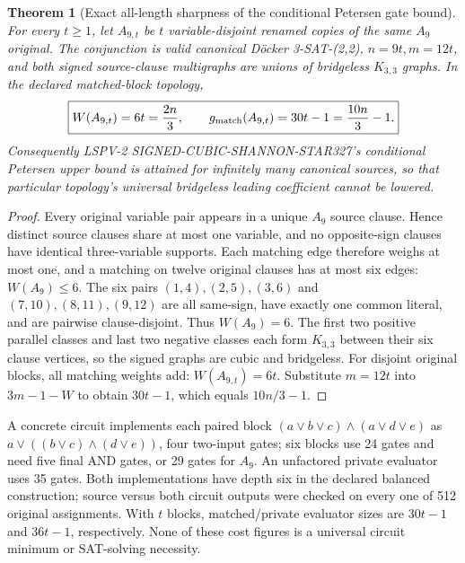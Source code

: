 \documentclass[11pt]{article}
\newtheorem{theorem}{Theorem}
\begin{document}
\begin{theorem}[Exact all-length sharpness of the conditional Petersen gate bound]
For every $t\ge1$, let $A_{9,t}$ be $t$ variable-disjoint renamed copies of the same $A_9$ original. The conjunction is valid canonical D\"ocker 3-SAT-(2,2), $n=9t,m=12t$, and both signed source-clause multigraphs are unions of bridgeless $K_{3,3}$ graphs. In the declared matched-block topology,
\[
\boxed{W(A_{9,t})=6t=\frac{2n}{3},\qquad
g_{\rm match}(A_{9,t})=30t-1=\frac{10n}{3}-1.}
\]
Consequently LSPV-2 SIGNED-CUBIC-SHANNON-STAR327's conditional Petersen \emph{upper} bound is attained for infinitely many canonical sources, so that particular topology's universal bridgeless leading coefficient cannot be lowered.
\end{theorem}
\begin{proof}
Every original variable pair appears in a unique $A_9$ source clause. Hence distinct source clauses share at most one variable, and no opposite-sign clauses have identical three-variable supports. Each matching edge therefore weighs at most one, and a matching on twelve original clauses has at most six edges: $W(A_9)\le6$. The six pairs $(1,4),(2,5),(3,6)$ and $(7,10),(8,11),(9,12)$ are all same-sign, have exactly one common literal, and are pairwise clause-disjoint. Thus $W(A_9)=6$. The first two positive parallel classes and last two negative classes each form $K_{3,3}$ between their six clause vertices, so the signed graphs are cubic and bridgeless. For disjoint original blocks, all matching weights add: $W(A_{9,t})=6t$. Substitute $m=12t$ into $3m-1-W$ to obtain $30t-1$, which equals $10n/3-1$.
\end{proof}
A concrete circuit implements each paired block $(a\vee b\vee c)\wedge(a\vee d\vee e)$ as $a\vee((b\vee c)\wedge(d\vee e))$, four two-input gates; six blocks use 24 gates and need five final AND gates, or 29 gates for $A_9$. An unfactored private evaluator uses 35 gates. Both implementations have depth six in the declared balanced construction; source versus both circuit outputs were checked on every one of 512 original assignments. With $t$ blocks, matched/private evaluator sizes are $30t-1$ and $36t-1$, respectively. None of these cost figures is a universal circuit minimum or SAT-solving necessity.
\end{document}
